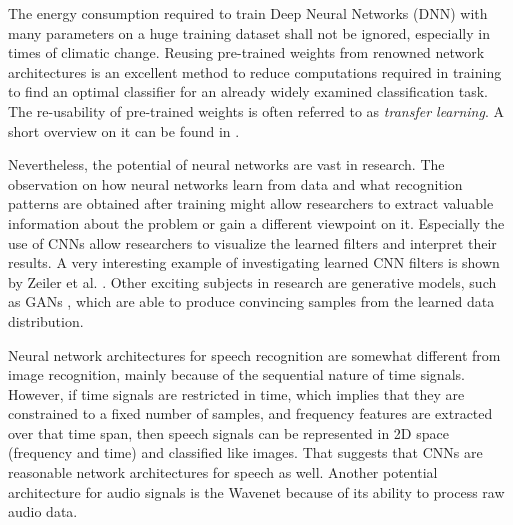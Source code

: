The energy consumption required to train Deep Neural Networks (DNN) with many parameters on a huge training dataset shall not be ignored, especially in times of climatic change.
Reusing pre-trained weights from renowned network architectures is an excellent method to reduce computations required in training to find an optimal classifier for an already widely examined classification task.
The re-usability of pre-trained weights is often referred to as \emph{transfer learning}.
A short overview on it can be found in \cite{TransferLearning}.

Nevertheless, the potential of neural networks are vast in research.
The observation on how neural networks learn from data and what recognition patterns are obtained after training might allow researchers to extract valuable information about the problem or gain a different viewpoint on it.
Especially the use of CNNs allow researchers to visualize the learned filters and interpret their results.
A very interesting example of investigating learned CNN filters is shown by Zeiler et al. \cite{Zeiler2013}.
Other exciting subjects in research are generative models, such as GANs \cite{Goodfellow2014}, which are able to produce convincing samples from the learned data distribution.

Neural network architectures for speech recognition are somewhat different from image recognition, mainly because of the sequential nature of time signals.
However, if time signals are restricted in time, which implies that they are constrained to a fixed number of samples, and frequency features are extracted over that time span, then speech signals can be represented in 2D space (frequency and time) and classified like images.
That suggests that CNNs are reasonable network architectures for speech as well.
Another potential architecture for audio signals is the Wavenet \cite{Oord2016} because of its ability to process raw audio data.